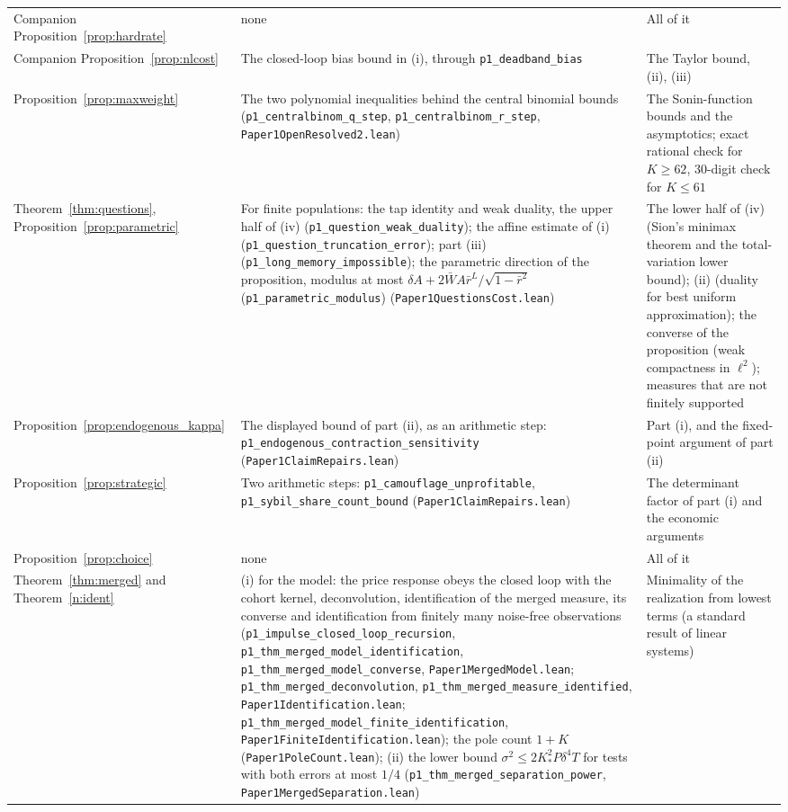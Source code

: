 \documentclass[12pt]{article}
\theoremstyle{definition}
\theoremstyle{remark}
\begin{document}
\begin{longtable}{>{\raggedright\arraybackslash}p{}>{\raggedright\arraybackslash}p{}>{\raggedright\arraybackslash}p{}}
Companion Proposition~\ref{prop:hardrate} & none & All of it\\
Companion Proposition~\ref{prop:nlcost} & The closed-loop bias bound in (i), through \texttt{p1\_deadband\_bias} & The Taylor bound, (ii), (iii)\\
Proposition~\ref{prop:maxweight} & The two polynomial inequalities behind the central binomial bounds (\texttt{p1\_centralbinom\_q\_step}, \texttt{p1\_centralbinom\_r\_step}, \nolinkurl{Paper1OpenResolved2.lean}) & The Sonin-function bounds and the asymptotics; exact rational check for $K\ge62$, 30-digit check for $K\le61$\\
Theorem~\ref{thm:questions}, Proposition~\ref{prop:parametric} & For finite populations: the tap identity and weak duality, the upper half of (iv) (\texttt{p1\_question\_weak\_duality}); the affine estimate of (i) (\texttt{p1\_question\_truncation\_error}); part (iii) (\texttt{p1\_long\_memory\_impossible}); the parametric direction of the proposition, modulus at most $\delta A+2\bar WA\bar r^L/\sqrt{1-\bar r^2}$ (\texttt{p1\_parametric\_modulus}) (\nolinkurl{Paper1QuestionsCost.lean}) & The lower half of (iv) (Sion's minimax theorem and the total-variation lower bound); (ii) (duality for best uniform approximation); the converse of the proposition (weak compactness in $\ell^2$); measures that are not finitely supported\\
Proposition~\ref{prop:endogenous_kappa} & The displayed bound of part (ii), as an arithmetic step: \nolinkurl{p1_endogenous_contraction_sensitivity} (\nolinkurl{Paper1ClaimRepairs.lean}) & Part (i), and the fixed-point argument of part (ii)\\
Proposition~\ref{prop:strategic} & Two arithmetic steps: \nolinkurl{p1_camouflage_unprofitable}, \nolinkurl{p1_sybil_share_count_bound} (\nolinkurl{Paper1ClaimRepairs.lean}) & The determinant factor of part (i) and the economic arguments\\
Proposition~\ref{prop:choice} & none & All of it\\
Theorem~\ref{thm:merged} and Theorem~\ref{n:ident} & (i) for the model: the price response obeys the closed loop with the cohort kernel, deconvolution, identification of the merged measure, its converse and identification from finitely many noise-free observations (\nolinkurl{p1_impulse_closed_loop_recursion}, \nolinkurl{p1_thm_merged_model_identification}, \nolinkurl{p1_thm_merged_model_converse}, \nolinkurl{Paper1MergedModel.lean}; \nolinkurl{p1_thm_merged_deconvolution}, \nolinkurl{p1_thm_merged_measure_identified}, \nolinkurl{Paper1Identification.lean}; \nolinkurl{p1_thm_merged_model_finite_identification}, \nolinkurl{Paper1FiniteIdentification.lean}); the pole count $1+K$ (\nolinkurl{Paper1PoleCount.lean}); (ii) the lower bound $\sigma^2\le2K_*^2P\delta^4T$ for tests with both errors at most $1/4$ (\nolinkurl{p1_thm_merged_separation_power}, \nolinkurl{Paper1MergedSeparation.lean}) & Minimality of the realization from lowest terms (a standard result of linear systems)\\

\end{longtable}
\end{document}
